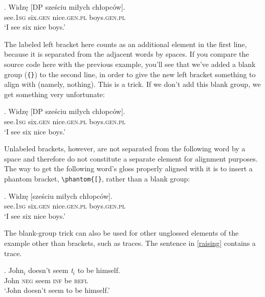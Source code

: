 \documentclass[letterpaper,12pt, twoside]{article}
\begin{document}
\exig. Widz\k{e}  [DP sze\'sciu {mi\l ych} {ch\l opc\'ow}]. \\ 
see.\textsc{1sg} {} six.\textsc{gen} nice.\textsc{gen.pl} boys.\textsc{gen.pl} \\ 
 `I see six nice boys.' 

The labeled left bracket here counts as an additional element in the first line, because it is separated from the adjacent words by spaces. If you compare the source code here with the previous example, you'll see that we've added a blank group (\verb|{}|) to the second line, in order to give the new left bracket something to align with (namely, nothing). This is a trick. If we don't add this blank group, we get something very unfortunate:

\exig. Widz\k{e}  [DP sze\'sciu {mi\l ych} {ch\l opc\'ow}]. \\ 
see.\textsc{1sg} six.\textsc{gen} nice.\textsc{gen.pl} boys.\textsc{gen.pl} \\
 `I see six nice boys.' 

Unlabeled brackets, however, are not separated from the following word by a space and therefore  do not constitute a separate element for alignment purposes. The way to get the following word's gloss  properly aligned with it is to insert a phantom bracket, \verb|\phantom{[}|, rather than a blank group:

\exg. 
Widz\k{e}  [sze\'sciu {mi\l ych} {ch\l opc\'ow}]. \\ 
see.\textsc{1sg} \phantom{[}six.\textsc{gen} nice.\textsc{gen.pl} boys.\textsc{gen.pl} \\ 
 `I see six nice boys.' 


The blank-group trick can also be used for other unglossed elements of the example other than brackets, such as traces. The sentence in \ref{raising} contains a trace.

\exg. John$_i$ doesn't seem \emph{t}$_i$ to be himself. \\
John	\textsc{neg} seem {} \textsc{inf} be \textsc{refl} \\
`John doesn't seem to be himself.' \label{raising}


%
\end{document}
